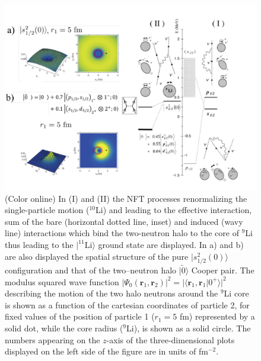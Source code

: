   \begin{figure}
  \centerline{\includegraphics*[width=\textwidth,angle=0]{nutshell/figs/fig1F3.pdf}}
  \caption{(Color online) In (I) and (II) the NFT processes renormalizing the single-particle motion ($^{10}$Li) and leading to the effective interaction, sum of the bare (horizontal dotted line, inset) and induced (wavy line) interactions which bind the two-neutron halo to the core of $^{9}$Li  thus leading to the $|^{11}$Li$\rangle$ ground state are displayed. In a) and b) are also displayed the  spatial structure of the pure $|s_{1/2}^2(0)\rangle$ configuration and that of the two--neutron halo $|\tilde 0\rangle$ Cooper pair. The modulus squared wave function $|\Psi_0(\mathbf{r}_1,\mathbf{r}_2)|^2=|\langle \mathbf{r}_1,\mathbf{r}_1|0^+\rangle|^2$ describing the motion of the two halo neutrons around the $^9$Li core 
  is shown as a function of the cartesian coordinates of particle 2, for fixed values of the
  position of particle 1 ($r_1 = 5$ fm) represented  by a solid dot, while the core radius ($^9$Li), is shown as a solid
  circle. The numbers appearing on the $z$-axis of the three-dimensional plots displayed on the left side of the figure are in units of fm$^{-2}$.}\label{fig1F3}
  \end{figure}

